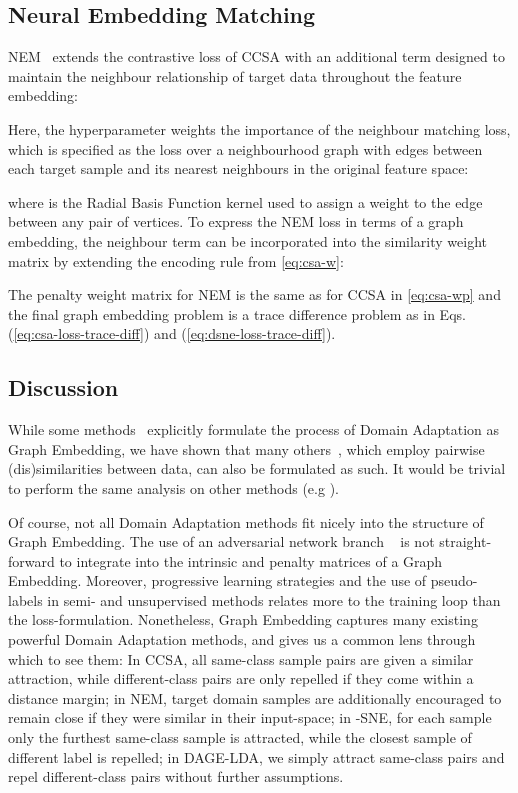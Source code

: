 \documentclass[journal]{IEEEtran}
\begin{document}
\subsection{Neural Embedding Matching} \label{sec:dage-nem}
NEM~\cite{wang2019nem} extends the contrastive loss of CCSA with an additional term designed to maintain the neighbour relationship of target data throughout the feature embedding:

Here, the hyperparameter  weights the importance of the neighbour matching loss, which is specified as the loss over a neighbourhood graph with edges between each target sample  and its  nearest neighbours  in the original feature space: 

where 
 is the Radial Basis Function kernel used to assign a weight to the edge between any pair of vertices.
To express the NEM loss in terms of a graph embedding, the neighbour term can be incorporated into the similarity weight matrix by extending the encoding rule from \cref{eq:csa-w}:

The penalty weight matrix for NEM is the same as for CCSA in \cref{eq:csa-wp} and the final graph embedding problem is a trace difference problem as in Eqs. (\ref{eq:csa-loss-trace-diff}) and (\ref{eq:dsne-loss-trace-diff}). \subsection{Discussion} \label{sec:discussion}

While some methods~\cite{ghifary2017sca, chen2019gef, hedegaard2020supervised} explicitly formulate the process of Domain Adaptation as Graph Embedding, we have shown that many others~\cite{motiian2017ccsa, xu2019dsne, wang2019nem}, which employ pairwise (dis)similarities between data, can also be formulated as such. It would be trivial to perform the same analysis on other methods (e.g \cite{koniusz2017domain}).

Of course, not all Domain Adaptation methods fit nicely into the structure of Graph Embedding. The use of an adversarial network branch ~\cite{tzeng2015simultaneous, ganin2016domain, long2018conditional} is not straight-forward to integrate into the intrinsic and penalty matrices of a Graph Embedding. Moreover, progressive learning strategies and the use of pseudo-labels in semi- and unsupervised methods \cite{wang2019nem, chen2019gef} relates more to the training loop than the loss-formulation.
Nonetheless, Graph Embedding captures many existing powerful Domain Adaptation methods, and gives us a common lens through which to see them: 
In CCSA, all same-class sample pairs are given a similar attraction, while different-class pairs are only repelled if they come within a distance margin; 
in NEM, target domain samples are additionally encouraged to remain close if they were similar in their input-space;
in -SNE, for each sample only the furthest same-class sample is attracted, while the closest sample of different label is repelled; in DAGE-LDA, we simply attract same-class pairs and repel different-class pairs without further assumptions.
\end{document}
